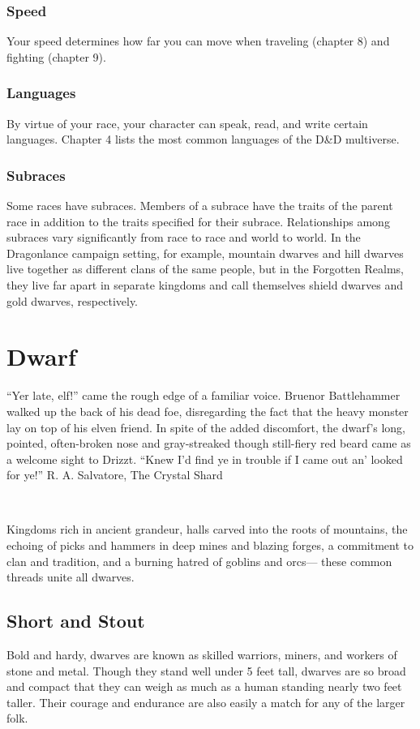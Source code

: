\subsubsection{Speed}
Your speed determines how far you can move when traveling (chapter 8) and fighting (chapter 9).

\subsubsection{Languages}
By virtue of your race, your character can speak, read, and write certain languages. Chapter 4 lists the most common languages of the D\&D multiverse.

\subsubsection{Subraces}
Some races have subraces. Members of a subrace have the traits of the parent race in addition to the traits specified for their subrace. Relationships among subraces vary significantly from race to race and world to world. In the Dragonlance campaign setting, for example, mountain dwarves and hill dwarves live together as different clans of the same people, but in the Forgotten Realms, they live far apart in separate kingdoms and call themselves shield dwarves and gold dwarves, respectively.

\section{Dwarf}
\DndQuote%
  {``Yer late, elf!'' came the rough edge of a familiar}
  {voice. Bruenor Battlehammer walked up the back of his dead foe, disregarding the fact that the heavy monster lay on top of his elven friend. In spite of the added discomfort, the dwarf’s long, pointed, often-broken nose and gray-streaked though still-fiery red beard came as a welcome sight to Drizzt. ``Knew I’d find ye in trouble if I came out an’ looked for ye!''}
  {R. A. Salvatore, The Crystal Shard}

\ \newline
\par\noindent Kingdoms rich in ancient grandeur, halls carved into the roots of mountains, the echoing of picks and hammers in deep mines and blazing forges, a commitment to clan and tradition, and a burning hatred of goblins and orcs— these common threads unite all dwarves.

\subsection{Short and Stout}
Bold and hardy, dwarves are known as skilled warriors, miners, and workers of stone and metal. Though they stand well under 5 feet tall, dwarves are so broad and compact that they can weigh as much as a human standing nearly two feet taller. Their courage and endurance are also easily a match for any of the larger folk.

